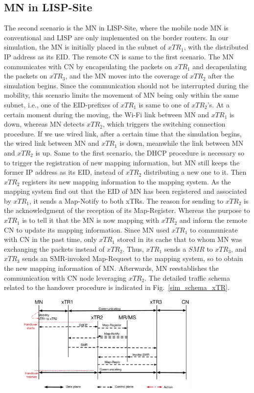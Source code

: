 {\subsection{MN in LISP-Site}
\label{sec:ns3_analysis_xTR}
The second scenario is the MN in LISP-Site, where the mobile node MN is conventional and LISP are only implemented on the border routers. In our simulation, the MN is initially placed in the subnet of $xTR_1$, with the distributed IP address as its EID. The remote CN is same to the first scenario. The MN communicates with CN by encapsulating the packets on $xTR_1$ and decapsulating the packets on $xTR_3$, and the MN moves into the coverage of $xTR_2$ after the simulation begins. Since the communication should not be interrupted during the mobility, this scenario limits the movement of MN being only within the same subnet, i.e., one of the EID-prefixes of $xTR_1$ is same to one of $xTR_2$'s. At a certain moment during the moving, the Wi-Fi link between MN and $xTR_1$ is down, whereas MN detects $xTR_2$, which triggers the switching connection procedure. If we use wired link, after a certain time that the simulation begins, the wired link between MN and $xTR_1$ is down, meanwhile the link between MN and $xTR_2$ is up. Same to the first scenario, the DHCP procedure is necessary so to trigger the registration of new mapping information, but MN still keeps the former IP address as its EID, instead of $xTR_2$ distributing a new one to it. Then $xTR_2$ registers its new mapping information to the mapping system. As the mapping system find out that the EID of MN has been registered and associated by $xTR_1$, it sends a Map-Notify to both xTRs. The reason for sending to $xTR_2$ is the acknowledgment of the reception of its Map-Register. Whereas the purpose to $xTR_1$ is to tell it that the MN is now mapping with $xTR_2$ and inform the remote CN to update its mapping information. Since MN used $xTR_1$ to communicate with CN in the past time, only $xTR_1$ stored in its cache that to whom MN was exchanging the packets instead of $xTR_2$. Thus, $xTR_1$ sends a $SMR$ to $xTR_3$, and $xTR_3$ sends an SMR-invoked Map-Request to the mapping system, so to obtain the new mapping information of MN. Afterwards, MN reestablishes the communication with CN node leveraging $xTR_2$. The detailed traffic schema related to the handover procedure is indicated in Fig.~\ref{sim_schema_xTR}.
\begin{figure}[!th]
	\centering
	\includegraphics[width=0.8\textwidth]{Pics/Mobility_xTR_schema_SMR_simplify}

\end{figure}}
